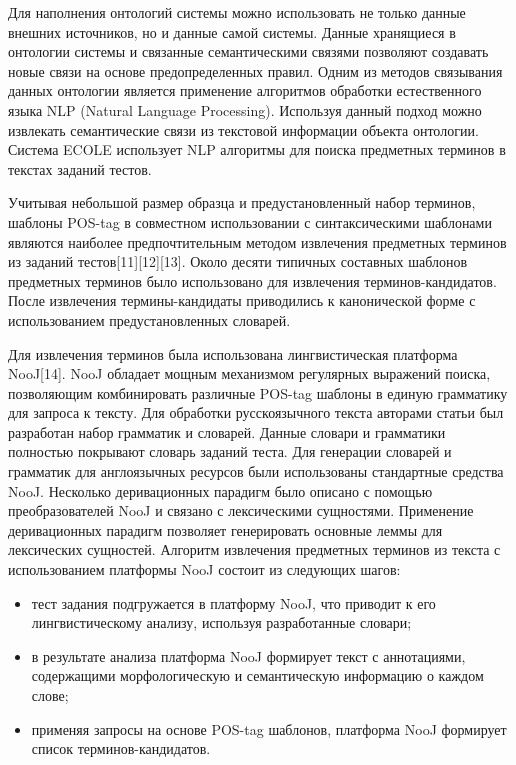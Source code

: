 Для наполнения онтологий системы можно использовать не только данные внешних источников, но и данные самой системы. Данные хранящиеся в онтологии системы и связанные семантическими связями позволяют создавать новые связи на основе предопределенных правил. Одним из методов связывания данных онтологии является применение алгоритмов обработки естественного языка NLP (Natural Language Processing). Используя данный подход можно извлекать семантические связи из текстовой информации объекта онтологии. Система ECOLE использует NLP алгоритмы для поиска предметных терминов в текстах заданий тестов.

Учитывая небольшой размер образца и предустановленный набор терминов,  шаблоны POS-tag в совместном использовании с синтаксическими шаблонами являются наиболее предпочтительным методом извлечения предметных терминов из заданий тестов[11][12][13]. Около десяти типичных составных шаблонов предметных терминов было использовано для извлечения терминов-кандидатов.  После извлечения термины-кандидаты приводились к канонической форме с использованием предустановленных словарей.

Для извлечения терминов была использована лингвистическая платформа NooJ[14]. NooJ обладает мощным механизмом регулярных выражений поиска, позволяющим комбинировать различные POS-tag шаблоны в единую грамматику для запроса к тексту. Для обработки русскоязычного текста авторами статьи был разработан набор грамматик и словарей. Данные словари и грамматики полностью покрывают словарь заданий теста. Для генерации словарей и грамматик для англоязычных ресурсов были использованы стандартные средства NooJ. Несколько деривационных парадигм было описано с помощью преобразователей NooJ и связано с лексическими сущностями. Применение деривационных парадигм позволяет генерировать основные леммы для лексических сущностей. Алгоритм извлечения предметных терминов из текста с использованием платформы NooJ состоит из следующих шагов:

\begin{itemize}
\item тест задания подгружается в платформу NooJ, что приводит к его лингвистическому анализу, используя разработанные словари;
\item в результате анализа платформа NooJ формирует текст с аннотациями, содержащими морфологическую и семантическую информацию о каждом слове;
\item применяя запросы на основе POS-tag шаблонов, платформа NooJ формирует список терминов-кандидатов.
\end{itemize}

